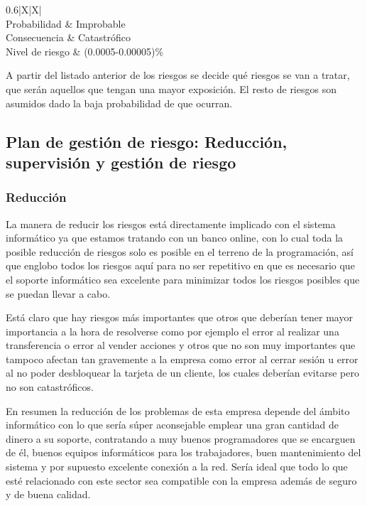 \begin{table}[H]
	\centering
	\begin{tabularx}{0.6\textwidth}{|X|X|}
		\hline
		\\
		\hline
		Probabilidad    & Improbable         \\
		\hline
		Consecuencia    & Catastrófico       \\
		\hline
		Nivel de riesgo & (0.0005-0.00005)\% \\
		\hline
	\end{tabularx}
\end{table}

A partir del listado anterior de los riesgos se decide qué riesgos se van a tratar, que serán
aquellos que tengan una mayor exposición. El resto de riesgos son asumidos dado la baja
probabilidad de que ocurran.

\subsection{Plan de gestión de riesgo: Reducción, supervisión y gestión de riesgo}
\subsubsection{Reducción}

La manera de reducir los riesgos está directamente implicado con el sistema informático ya que estamos tratando con un banco online, con lo cual toda la posible reducción de riesgos solo es posible en el terreno de la programación, así que englobo todos los riesgos aquí para no ser repetitivo en que es necesario que el soporte informático sea excelente para minimizar todos los riesgos posibles que se puedan llevar a cabo.

Está claro que hay riesgos más importantes que otros que deberían tener mayor importancia a la hora de resolverse como por ejemplo el error al realizar una transferencia o error al vender acciones y otros que no son muy importantes que tampoco afectan tan gravemente a la empresa como error al cerrar sesión u error al no poder desbloquear la tarjeta de un cliente, los cuales deberían evitarse pero no son catastróficos.

En resumen la reducción de los problemas de esta empresa depende del ámbito informático con lo que sería súper aconsejable emplear una gran cantidad de dinero a su soporte, contratando a muy buenos programadores que se encarguen de él, buenos equipos informáticos para los trabajadores, buen mantenimiento del sistema y por supuesto excelente conexión a la red. Sería ideal que todo lo que esté relacionado con este sector sea compatible con la empresa además de seguro y de buena calidad.

